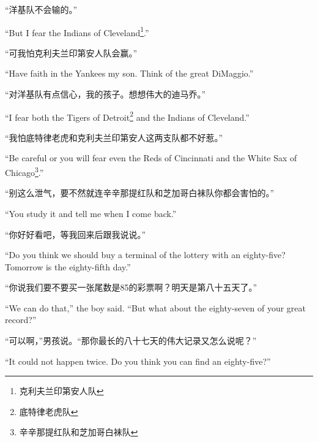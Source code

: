 \begin{paracol}{2}
\switchcolumn

“洋基队不会输的。”

\switchcolumn*

``But I fear the Indians of Cleveland\footnote{克利夫兰印第安人队}.''

\switchcolumn

“可我怕克利夫兰印第安人队会赢。”

\switchcolumn*

``Have faith in the Yankees my son. Think of the great DiMaggio.''

\switchcolumn

“对洋基队有点信心，我的孩子。想想伟大的迪马乔。”

\switchcolumn*

``I fear both the Tigers of Detroit\footnote{底特律老虎队} and the Indians of Cleveland.''

\switchcolumn

“我怕底特律老虎和克利夫兰印第安人这两支队都不好惹。”

\switchcolumn*

``Be careful or you will fear even the Reds of Cincinnati and the White Sax of Chicago\footnote{辛辛那提红队和芝加哥白袜队}.''

\switchcolumn

“别这么泄气，要不然就连辛辛那提红队和芝加哥白袜队你都会害怕的。”

\switchcolumn*

``You study it and tell me when I come back.''

\switchcolumn

“你好好看吧，等我回来后跟我说说。”

\switchcolumn*

``Do you think we should buy a \gls{terminal} of the lottery with an eighty-five?
Tomorrow is the eighty-fifth day.''

\switchcolumn

“你说我们要不要买一张尾数是85的彩票啊？明天是第八十五天了。”

\switchcolumn*

``We can do that,'' the boy said. ``But what about the eighty-seven of your great record?''

\switchcolumn

“可以啊，”男孩说。“那你最长的八十七天的伟大记录又怎么说呢？”

\switchcolumn*

``It could not happen twice. Do you think you can find an eighty-five?''


\end{paracol}
